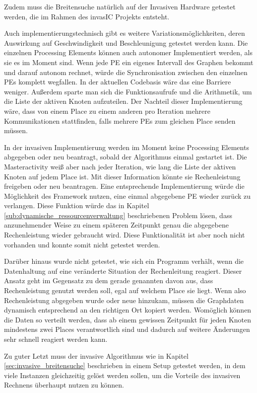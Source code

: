 Zudem muss die Breitensuche natürlich auf der Invasiven Hardware getestet werden, die im Rahmen des invasIC Projekts entsteht.

Auch implementierungstechnisch gibt es weitere Variationsmöglichkeiten, deren Auswirkung auf Geschwindigkeit und Beschleunigung getestet werden kann. Die einzelnen Processing Elements können auch autonomer Implementiert werden, als sie es im Moment sind. Wenn jede PE ein eigenes Intervall des Graphen bekommt und darauf autonom rechnet, würde die Synchronisation zwischen den einzelnen PEs komplett wegfallen. In der aktuellen Codebasis wäre das eine Barriere weniger. Außerdem sparte man sich die Funktionsaufrufe und die Arithmetik, um die Liste der aktiven Knoten aufzuteilen. Der Nachteil dieser Implementierung wäre, dass von einem Place zu einem anderen pro Iteration mehrere Kommunikationen stattfinden, falls mehrere PEs zum gleichen Place senden müssen. 

In der invasiven Implementierung werden im Moment keine Processing Elements abgegeben oder neu beantragt, sobald der Algorithmus einmal gestartet ist. Die Masteractivity weiß aber nach jeder Iteration, wie lang die Liste der aktiven Knoten auf jedem Place ist. Mit dieser Information könnte sie Rechenleistung freigeben oder neu beantragen. Eine entsprechende Implementierung würde die Möglichkeit des Framework nutzen, eine einmal abgegebene PE wieder zurück zu verlangen. Diese Funktion würde das in Kapitel \ref{sub:dynamische_ressourcenverwaltung} beschriebenen Problem lösen, dass anzunehmender Weise zu einem späteren Zeitpunkt genau die abgegebene Rechenleistung wieder gebraucht wird. Diese Funktionalität ist aber noch nicht vorhanden und konnte somit nicht getestet werden. 

Darüber hinaus wurde nicht getestet, wie sich ein Programm verhält, wenn die Datenhaltung auf eine veränderte Situation der Rechenleitung reagiert. Dieser Ansatz geht im Gegensatz zu dem gerade genannten davon aus, dass Rechenleistung genutzt werden soll, egal auf welchem Place sie liegt. Wenn also Rechenleistung abgegeben wurde oder neue hinzukam, müssen die Graphdaten dynamisch entsprechend an den richtigen Ort kopiert werden. Womöglich können die Daten so verteilt werden, dass ab einem gewissen Zeitpunkt für jeden Knoten mindestens zwei Places verantwortlich sind und dadurch auf weitere Änderungen sehr schnell reagiert werden kann.

Zu guter Letzt muss der invasive Algorithmus wie in Kapitel \ref{sec:invasive_breitensuche} beschrieben in einem Setup getestet werden, in dem viele Instanzen gleichzeitig gelöst werden sollen, um die Vorteile des invasiven Rechnens überhaupt nutzen zu können.


